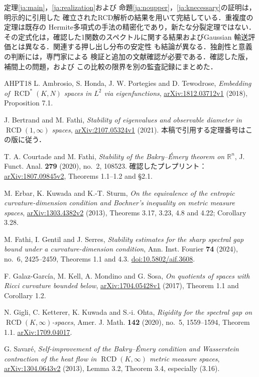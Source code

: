 \documentclass[12pt]{amsart}
\theoremstyle{definition}
\theoremstyle{remark}
\numberwithin{equation}{section}
\newcommand{\R}{\mathbb{R}}
\theoremstyle{plain}
\begin{document}
定理\ref{ja:main}，\ref{ja:realization}および
命題\ref{ja:noupper}，\ref{ja:knecessary}の証明は，明示的に引用した
確立されたRCD解析の結果を用いて完結している．重複度の定理は既存の
Hermite多項式の手法の精密化であり，新たな分裂定理ではない．
その定式化は，確認した1関数のスペクトルに関する結果およびGaussian
輸送評価\cite{ja:BF,ja:CF}とは異なる．関連する押し出し分布の安定性
\cite{ja:Serres}も結論が異なる．独創性と意義の判断には，専門家による
検証と追加の文献確認が必要である．確認した版，補間上の問題，および
この比較の限界を別の監査記録にまとめた．
\begin{thebibliography}{AHPT18}
L. Ambrosio, S. Honda, J. W. Portegies and D. Tewodrose,
\emph{Embedding of $\operatorname{RCD}^{*}(K,N)$ spaces in $L^2$ via eigenfunctions},
\href{https://arxiv.org/abs/1812.03712v1}{arXiv:1812.03712v1} (2018), Proposition 7.1.

J. Bertrand and M. Fathi,
\emph{Stability of eigenvalues and observable diameter in
$\operatorname{RCD}(1,\infty)$ spaces},
\href{https://arxiv.org/abs/2107.05324v1}{arXiv:2107.05324v1} (2021).
本稿で引用する定理番号はこの版に従う．

T. A. Courtade and M. Fathi,
\emph{Stability of the Bakry--\'Emery theorem on $\R^n$},
J. Funct. Anal. \textbf{279} (2020), no.~2, 108523.
確認したプレプリント： \href{https://arxiv.org/abs/1807.09845v2}{arXiv:1807.09845v2},
Theorems 1.1--1.2 and \S2.1.

M. Erbar, K. Kuwada and K.-T. Sturm,
\emph{On the equivalence of the entropic curvature-dimension condition
and Bochner's inequality on metric measure spaces},
\href{https://arxiv.org/abs/1303.4382v2}{arXiv:1303.4382v2} (2013),
Theorems 3.17, 3.23, 4.8 and 4.22; Corollary 3.28.

M. Fathi, I. Gentil and J. Serres,
\emph{Stability estimates for the sharp spectral gap bound under a
curvature-dimension condition},
Ann. Inst. Fourier \textbf{74} (2024), no.~6, 2425--2459,
Theorems 1.1 and 4.3.
\href{https://doi.org/10.5802/aif.3608}{doi:10.5802/aif.3608}.

F. Galaz-Garc\'ia, M. Kell, A. Mondino and G. Sosa,
\emph{On quotients of spaces with Ricci curvature bounded below},
\href{https://arxiv.org/abs/1704.05428v1}{arXiv:1704.05428v1} (2017),
Theorem 1.1 and Corollary 1.2.

N. Gigli, C. Ketterer, K. Kuwada and S.-i. Ohta,
\emph{Rigidity for the spectral gap on $\operatorname{RCD}(K,\infty)$-spaces},
Amer. J. Math. \textbf{142} (2020), no.~5, 1559--1594,
Theorem 1.1.
\href{https://arxiv.org/abs/1709.04017}{arXiv:1709.04017}.

G. Savar\'e,
\emph{Self-improvement of the Bakry--\'Emery condition and Wasserstein
contraction of the heat flow in $\operatorname{RCD}(K,\infty)$ metric measure spaces},
\href{https://arxiv.org/abs/1304.0643v2}{arXiv:1304.0643v2} (2013),
Lemma 3.2, Theorem 3.4, especially (3.16).
\end{thebibliography}
\end{document}
